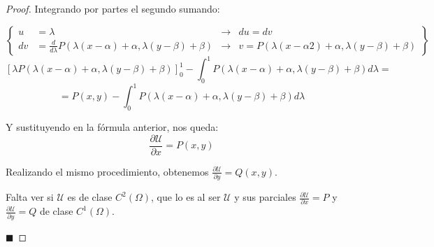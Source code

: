 \documentclass[12pt]{article}
\newcommand{\U}{\mathcal{U}}
\newcommand{\qued}{\hfill$\blacksquare$}
\newtheorem{proof}{Demostración:}
\begin{document}
\begin{proof}
Integrando por partes el segundo sumando:

\[
\left \{ 
\begin{array}{llll}
u & = \lambda &\longrightarrow & du=dv\\
dv & = \frac{d}{d\lambda}P(\lambda(x-\alpha)+\alpha,\lambda(y-\beta)+\beta) &\longrightarrow & v=P(\lambda(x-\alpha2)+\alpha,\lambda(y-\beta)+\beta)
\end{array}
\right\}
\]
\[
[\lambda P(\lambda(x-\alpha)+\alpha,\lambda(y-\beta)+\beta)]^1_0-\int_0^1P(\lambda(x-\alpha)+\alpha,\lambda(y-\beta)+\beta)d\lambda=
\]
\[
=P(x,y)-\int_0^1P(\lambda(x-\alpha)+\alpha,\lambda(y-\beta)+\beta)d\lambda
\]

Y sustituyendo en la fórmula anterior, nos queda:
\[
\frac{\partial \U}{\partial x} = P(x,y)
\]

Realizando el mismo procedimiento, obtenemos $\displaystyle\frac{\partial \U}{\partial y}=Q(x,y)$. 

Falta ver si $\U$ es de clase $C^2(\Omega)$, que lo es al ser $\U$  y sus parciales $\frac{\partial\U}{\partial x}=P$ y $\frac{\partial\U}{\partial y}=Q$ de clase $C^1(\Omega)$.  

\qued

\end{proof}
\end{document}
